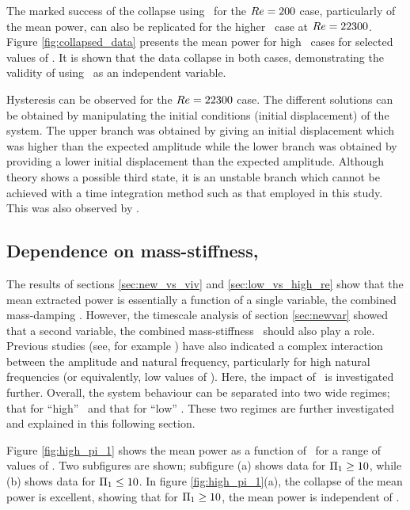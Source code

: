 \label{sec:low_vs_high_re}
The marked success of the collapse using \massdamp\ for the $Re = 200$ case, particularly of the mean power, can also be replicated for the higher \reynoldsnumber\ case at $Re = 22300$. Figure \ref{fig:collapsed_data} presents the mean power for high \reynoldsnumber\ cases for selected values of \massstiff. It is shown that the data collapse in both cases, demonstrating the validity of using \massdamp\ as an independent variable.



Hysteresis can be observed for the $Re = 22300$ case. The different solutions can be obtained by manipulating the initial conditions (initial displacement) of the system. The upper branch was obtained by giving an initial displacement which was higher than the expected amplitude while the lower branch was obtained by providing a lower initial displacement than the expected amplitude. Although theory shows a possible third state, it is an unstable branch which cannot be achieved with a time integration method such as that employed in this study. This was also observed by \cite{Vio2007}.


\subsection{Dependence on mass-stiffness, \massstiff}
\label{subsec:dependence pi_1}

The results of sections \ref{sec:new_vs_viv} and \ref{sec:low_vs_high_re} show that the mean extracted power is essentially a function of a single variable, the combined mass-damping \massdamp. However, the timescale analysis of section \ref{sec:newvar} showed that a second variable, the combined mass-stiffness \massstiff\ should also play a role. Previous studies (see, for example \citet{bouclin:77}) have also indicated a complex interaction between the amplitude and natural frequency, particularly for high natural frequencies (or equivalently, low values of \massstiff). Here, the impact of \massstiff\ is investigated further. Overall, the system behaviour can be separated into two wide regimes; that for ``high'' \massstiff\ and that for ``low'' \massstiff. These two regimes are further investigated and explained in this following section.

Figure \ref{fig:high_pi_1} shows the mean power as a function of \massdamp\ for a range of values of \massstiff. Two subfigures are shown; subfigure (a) shows data for $\Pi_1 \geq 10$, while (b) shows data for $\Pi_1 \leq 10$. In figure \ref{fig:high_pi_1}(a), the collapse of the mean power is excellent, showing that for $\Pi_1 \geq 10$, the mean power is independent of \massstiff.

